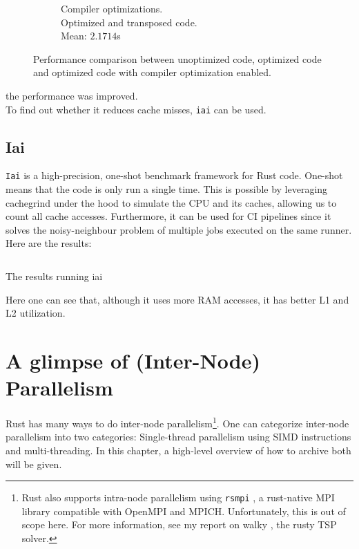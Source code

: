 \begin{figure}[H]
\begin{subfigure}{.5\textwidth}
  \caption{Compiler optimizations.\\\hspace*{0.6cm}Optimized and transposed code.\\\hspace*{0.6cm}Mean: $2.1714$s}
\end{subfigure}%
  \caption{Performance comparison between unoptimized code, optimized code and optimized code with compiler optimization enabled.}
\end{figure}

the performance was improved.\\

To find out whether it reduces cache misses, \texttt{iai} can be used.

\subsection{Iai}
\texttt{Iai} \cite{iai} is a high-precision, one-shot benchmark framework for Rust code. One-shot means that the code is only run a single time. This is possible by leveraging cachegrind \cite{cachegrind} under the hood to simulate the CPU and its caches, allowing us to count all cache accesses. Furthermore, it can be used for \ac{CI} pipelines since it solves the noisy-neighbour problem of multiple jobs executed on the same runner. Here are the results:

\begin{listing}[H]
  \inputminted{text}{./assets/iai.txt}
\caption{The results running iai}
\end{listing}

Here one can see that, although it uses more RAM accesses, it has better L1 and L2 utilization.

\section{A glimpse of (Inter-Node) Parallelism}
Rust has many ways to do inter-node parallelism\footnote{Rust also supports intra-node parallelism using \texttt{rsmpi} \cite{rsmpi}, a rust-native MPI library compatible with OpenMPI and MPICH. Unfortunately, this is out of scope here. For more information, see my report on walky \cite{walky}, the rusty TSP solver.}. One can categorize inter-node parallelism into two categories: Single-thread parallelism using SIMD instructions and multi-threading. In this chapter, a high-level overview of how to archive both will be given.

